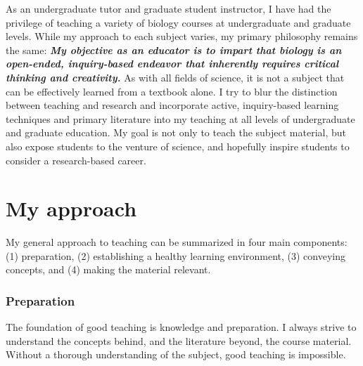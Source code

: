 \documentclass[10pt]{article}
\begin{document}
\raggedright
\singlespacing

As an undergraduate tutor and graduate student instructor, I have had the
privilege of teaching a variety of biology courses at undergraduate and
graduate levels.
While my approach to each subject varies, my primary philosophy remains the
same:
\textbf{\textit{My objective as an educator is to impart that biology is an
open-ended, inquiry-based endeavor that inherently requires critical thinking
and creativity.}}
As with all fields of science, it is not a subject that can be effectively
learned from a textbook alone.
I try to blur the distinction between teaching and research and incorporate
active, inquiry-based learning techniques and primary literature into my
teaching at all levels of undergraduate and graduate education.
My goal is not only to teach the subject material, but also expose students to
the venture of science, and hopefully inspire students to consider a
research-based career. 

\section*{My approach}
My general approach to teaching can be summarized in four main components:
(1) preparation,
(2) establishing a healthy learning environment,
(3) conveying concepts, and
(4) making the material relevant.

\subsubsection*{Preparation}
The foundation of good teaching is knowledge and preparation.
I always strive to understand the concepts behind, and the literature beyond,
the course material.
Without a thorough understanding of the subject, good teaching is impossible.
\end{document}
